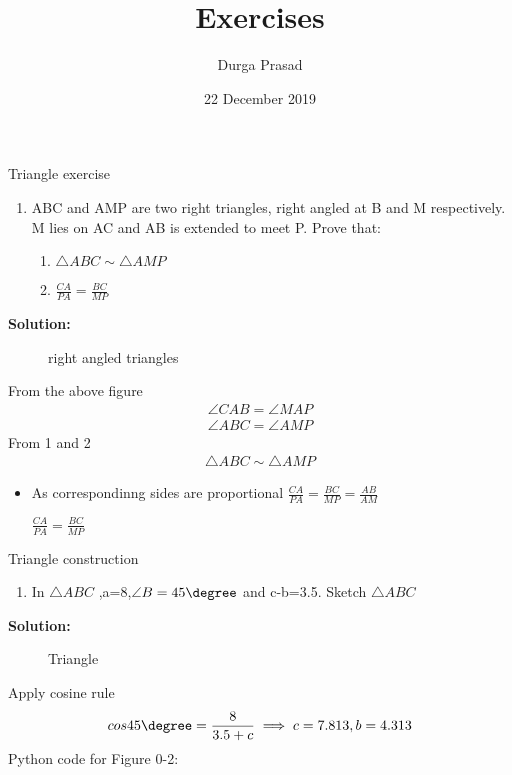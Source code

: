 \documentclass{beamer}
\title[Your Short Title]{Exercises}
\author{Durga Prasad}
\institute{}
\date{22 December 2019}
\newcounter{saveenumi}
\newcommand{\seti}{\setcounter{saveenumi}{\value{enumi}}}
\newcommand{\conti}{\setcounter{enumi}{\value{saveenumi}}}
\begin{document}
\begin{frame}
  \titlepage
\end{frame}
\begin{frame}{Triangle exercise}
\begin{enumerate}
\item ABC and AMP are two right triangles, right
angled at B and M respectively. M lies on AC
and AB is extended to meet P. Prove that:
\seti
\begin{enumerate}
\item $\triangle{ABC} \sim \triangle{AMP}$
\item $\frac{CA}{PA}=\frac{BC}{MP}$
\end{enumerate}
\end{enumerate}
\textbf{Solution:}

\begin{figure}[!ht]
\resizebox{.4\linewidth}{!}{}
\caption{right angled triangles}
\label{fig:foo}
\end{figure}
\end{frame}
\begin{frame}
From the above figure
\begin{align}
	\angle{CAB} =\angle{MAP} \\
	\angle{ABC} = \angle{AMP}
\end{align}
From 1 and 2
\begin{align}
\triangle{ABC} \sim \triangle{AMP}
\end{align}
\begin{itemize}
\item As correspondinng sides are proportional
$\frac{CA}{PA}=\frac{BC}{MP}=\frac{AB}{AM}$

\begin{center}
$\frac{CA}{PA}=\frac{BC}{MP}$
\end{center}
\end{itemize}
\end{frame}
\begin{frame}{Triangle construction}
\begin{enumerate}
\conti
\item In $\triangle{ABC}$ ,a=8,$\angle{B}=45\degree$ and c-b=3.5. Sketch $\triangle{ABC}$
\seti
\end{enumerate}
\textbf{Solution:}
\begin{figure}[!ht]
\resizebox{0.3\linewidth}{!}{}
\caption{Triangle}
\label{fig:foo}
\end{figure}
Apply cosine rule \\
\begin{align*}
	cos{45\degree}=\frac{8}{3.5+c} \implies c=7.813, b=4.313
\end{align*}
Python code for Figure 0-2: 
\end{frame}
\end{document}

